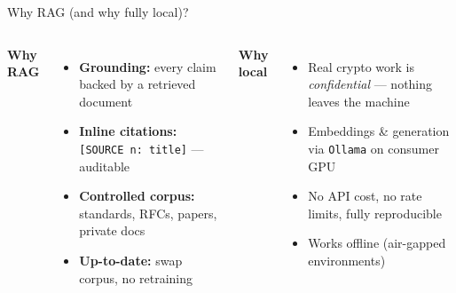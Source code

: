 \documentclass[aspectratio=169]{beamer}
\begin{document}
\begin{frame}{Why RAG (and why fully local)?}
  \begin{columns}[t, totalwidth=\linewidth]
      \textbf{Why RAG}\\[2pt]
      \begin{itemize}
        \item \textbf{Grounding:} every claim backed by a retrieved document
        \item \textbf{Inline citations:} \texttt{[SOURCE n: title]} ---
          auditable
        \item \textbf{Controlled corpus:} standards, RFCs, papers, private
          docs
        \item \textbf{Up-to-date:} swap corpus, no retraining
      \end{itemize}
      \textbf{Why local}\\[2pt]
      \begin{itemize}
        \item Real crypto work is \emph{confidential} --- nothing leaves the
          machine
        \item Embeddings \& generation via \texttt{Ollama} on consumer GPU
        \item No API cost, no rate limits, fully reproducible
        \item Works offline (air-gapped environments)
      \end{itemize}
  \end{columns}
\end{frame}
\end{document}
